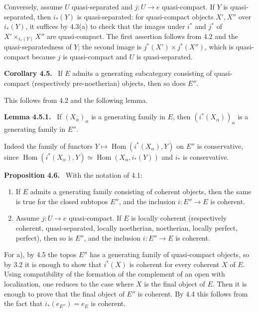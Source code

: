 \documentclass[11pt]{article}
\newcommand{\Hom}{\operatorname{Hom}}
\newenvironment{statement}[1]{\par\medskip\noindent\textbf{#1.}\ }{\par\medskip}
\begin{document}
Conversely, assume \(U\) quasi-separated and \(j:U\to e\) quasi-compact. If \(Y\) is quasi-separated, then \(i_*(Y)\) is quasi-separated: for quasi-compact objects \(X',X''\) over \(i_*(Y)\), it suffices by 4.3(a) to check that the images under \(i^*\) and \(j^*\) of \(X'\times_{i_*(Y)}X''\) are quasi-compact. The first assertion follows from 4.2 and the quasi-separatedness of \(Y\); the second image is \(j^*(X')\times j^*(X'')\), which is quasi-compact because \(j\) is quasi-compact and \(U\) is quasi-separated.

\begin{statement}{Corollary 4.5}
If \(E\) admits a generating subcategory consisting of quasi-compact (respectively pre-noetherian) objects, then so does \(E''\).
\end{statement}

This follows from 4.2 and the following lemma.

\begin{statement}{Lemma 4.5.1}
If \((X_\alpha)_\alpha\) is a generating family in \(E\), then \((i^*(X_\alpha))_\alpha\) is a generating family in \(E''\).
\end{statement}

Indeed the family of functors \(Y\mapsto \Hom(i^*(X_\alpha),Y)\) on \(E''\) is conservative, since \(\Hom(i^*(X_\alpha),Y)\simeq\Hom(X_\alpha,i_*(Y))\) and \(i_*\) is conservative.

\begin{statement}{Proposition 4.6}
With the notation of 4.1:
\begin{enumerate}[label=\alph*)]
\item If \(E\) admits a generating family consisting of coherent objects, then the same is true for the closed subtopos \(E''\), and the inclusion \(i:E''\to E\) is coherent.
\item Assume \(j:U\to e\) quasi-compact. If \(E\) is locally coherent (respectively coherent, quasi-separated, locally noetherian, noetherian, locally perfect, perfect), then so is \(E''\), and the inclusion \(i:E''\to E\) is coherent.
\end{enumerate}
\end{statement}

For a), by 4.5 the topos \(E''\) has a generating family of quasi-compact objects, so by 3.2 it is enough to show that \(i^*(X)\) is coherent for every coherent \(X\) of \(E\). Using compatibility of the formation of the complement of an open with localization, one reduces to the case where \(X\) is the final object of \(E\). Then it is enough to prove that the final object of \(E''\) is coherent. By 4.4 this follows from the fact that \(i_*(e_{E''})=e_E\) is coherent.
\end{document}
